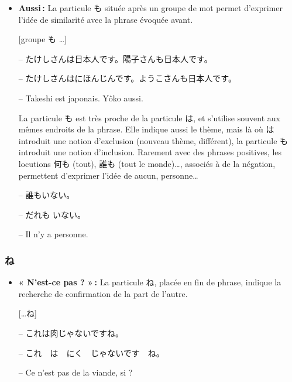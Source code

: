     \begin{itemize}
        \item \textbf{Aussi :} La particule も située après un groupe de mot permet d'exprimer l'idée de similarité avec la phrase évoquée avant.
        \begin{center}
            [groupe も \ldots]
        \end{center}
        \begin{tcolorbox}
            -- たけしさんは日本人です。陽子さんも日本人です。

            -- たけしさんはにほんじんです。ようこさんも日本人です。

            -- Takeshi est japonais. Yôko aussi.
        \end{tcolorbox}
        La particule も est très proche de la particule は, et s'utilise souvent aux mêmes endroits de la phrase. Elle indique aussi le thème, mais là où は introduit une notion d'exclusion (nouveau thème, différent), la particule も introduit une notion d'inclusion. Rarement avec des phrases positives, les locutions 何も (tout), 誰も (tout le monde)\dots, associés à de la négation, permettent d'exprimer l'idée de aucun, personne\dots

        \begin{tcolorbox}
            -- 誰もいない。

            -- だれも いない。

            -- Il n'y a personne.
        \end{tcolorbox}
    \end{itemize}

        \subsubsection{ね}

    \begin{itemize}
        \item \textbf{« N'est-ce pas ? » :} La particule ね, placée en fin de phrase, indique la recherche de confirmation de la part de l'autre.
        \begin{center}
            [\ldots ね]
        \end{center}
        \begin{tcolorbox}
            -- これは肉じゃないですね。

            -- これ　は　にく　じゃないです　ね。

            -- Ce n'est pas de la viande, si ?
        \end{tcolorbox}
    \end{itemize}

